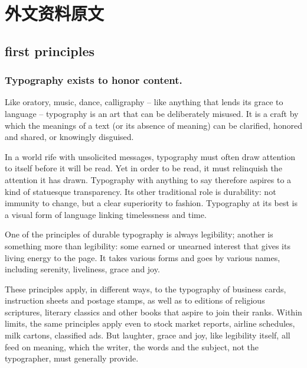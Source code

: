 ﻿%

\chapter{外文资料原文}
\label{cha:engorg}
\section[First Principles]{first principles}

\subsection{Typography exists to honor content.}

Like oratory, music, dance, calligraphy -- like anything that lends its grace to language -- typography is an art that can be deliberately misused. It is a craft by which the meanings of a text (or its absence of meaning) can be clarified, honored and shared, or knowingly disguised.

In a world rife with unsolicited messages, typography must often draw attention to itself before it will be read. Yet in order to be read, it must relinquish the attention it has drawn. Typography with anything to say therefore aspires to a kind of statuesque transparency. Its other traditional role is durability: not immunity to change, but a clear superiority to fashion. Typography at its best is a visual form of language linking timelessness and time.

One of the principles of durable typography is always legibility; another is something more than legibility: some earned or unearned interest that gives its living energy to the page. It takes various forms and goes by various names, including serenity, liveliness, grace and joy.

These principles apply, in different ways, to the typography of business cards, instruction sheets and postage stamps, as well as to editions of religious scriptures, literary classics and other books that aspire to join their ranks. Within limits, the same principles apply even to stock market reports, airline schedules, milk cartons, classified ads. But laughter, grace and joy, like legibility itself, all feed on meaning, which the writer, the words and the subject, not the typographer, must generally provide.

